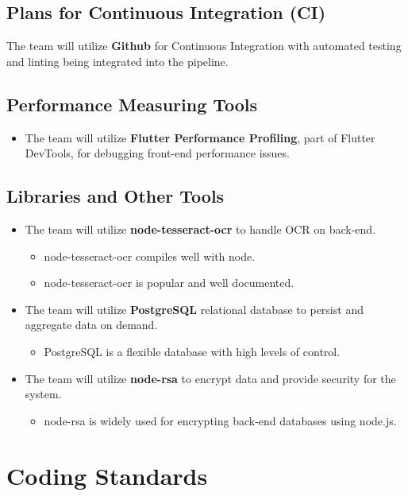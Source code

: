 \documentclass{article}
\begin{document}
\subsection{Plans for Continuous Integration (CI)}
    The team will utilize \textbf{Github} for Continuous Integration with automated testing and linting being integrated into the pipeline.
\subsection{Performance Measuring Tools}
    \begin{itemize}
        \item The team will utilize \textbf{Flutter Performance Profiling}, part of  Flutter DevTools, for debugging front-end performance issues.
    \end{itemize}
\subsection{Libraries and Other Tools}
    \begin{itemize}
        \item The team will utilize \textbf{node-tesseract-ocr} to handle OCR on back-end.
        \begin{itemize}
            \item node-tesseract-ocr compiles well with node.
            \item node-tesseract-ocr is popular and well documented.
        \end{itemize}
        \item The team will utilize \textbf{PostgreSQL} relational database to persist and aggregate data on demand.
        \begin{itemize}
            \item PostgreSQL is a flexible database with high levels of control.
        \end{itemize}
        \item The team will utilize \textbf{node-rsa} to encrypt data and provide security for the system.
        \begin{itemize}
            \item node-rsa is widely used for encrypting back-end databases using node.js.
        \end{itemize}
    \end{itemize}

\section{Coding Standards}
\end{document}
